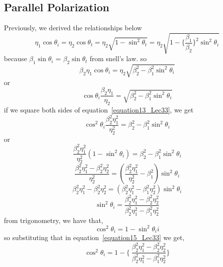 \subsection{Parallel Polarization}
Previously, we derived the relationships below
\begin{dmath}
\eta_1\cos\theta_i = \eta_2\cos\theta_t  = \eta_2\sqrt{1 - \sin^2\theta_t} = \eta_2\sqrt{1- \Bigg\{\dfrac{\beta_1}{\beta_2}\Bigg\}^2\sin^2\theta_i}
\end{dmath}
because $\beta_1\sin\theta_i$ = $\beta_2\sin\theta_t$ from snell's law. so
\begin{equation*}
\beta_2\eta_1\cos\theta_i = \eta_2\sqrt{\beta_2^2-\beta_1^2\sin^2\theta_i}
\end{equation*}
or
\begin{equation}
\cos\theta_i\dfrac{\beta_2\eta_1}{\eta_2} = \sqrt{\beta_2^2-\beta_1^2\sin^2\theta_i}
\label{equation13_Lec33}
\end{equation}
if we square both sides of equation~\ref{equation13_Lec33}, we get
\begin{equation*}
\cos^2\theta_i \dfrac{\beta^2_2\eta^2_1}{\eta^2_2} = \beta^2_2 - \beta^2_1\sin^2\theta_i
\end{equation*}
or
\begin{equation}
\dfrac{\beta^2_2\eta^2_1}{\eta^2_2}(1 - \sin^2\theta_i) = \beta^2_2 - \beta^2_1\sin^2\theta_i
\end{equation}
\begin{equation*}
\dfrac{\beta^2_2\eta^2_1 - \beta^2_2\eta^2_2}{\eta^2_2} = (\dfrac{\beta^2_2\eta^2_1}{\eta^2_2} - \beta^2_1)\sin^2\theta_i
\end{equation*}
\begin{equation*}
\beta^2_2\eta^2_1 - \beta^2_2\eta^2_2 = (\beta^2_2\eta^2_1 - \beta^2_1\eta^2_2)\sin^2{\theta_i}
\end{equation*}
\begin{equation}
\sin^2{\theta_i} = \dfrac{\beta^2_2\eta^2_1 - \beta^2_2\eta^2_2}{\beta^2_2\eta^2_1 - \beta^2_1\eta^2_2}
\label{equation15_Lec33}
\end{equation}
from trigonometry, we have that,
\begin{equation*}
\cos^2{\theta_i} = 1 - \sin^2{\theta_ii}
\end{equation*}
so substituting that in equation~\ref{equation15_Lec33} we get,
\begin{equation}
\cos^2{\theta_i} = 1 - \Bigg\{\ \dfrac{\beta^2_2\eta^2_1 - \beta^2_2\eta^2_2}{\beta^2_2\eta^2_1 - \beta^2_1\eta^2_2} \Bigg\}
\end{equation}
